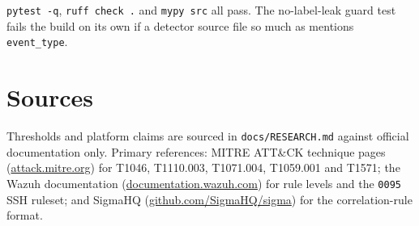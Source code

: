 \documentclass[11pt,a4paper]{article}
\newcommand{\code}[1]{\texttt{#1}}
\begin{document}
\code{pytest -q}, \code{ruff check .} and \code{mypy src} all pass. The
no-label-leak guard test fails the build on its own if a detector source file
so much as mentions \code{event\_type}.

\section*{Sources}

Thresholds and platform claims are sourced in \code{docs/RESEARCH.md} against
official documentation only. Primary references: MITRE ATT\&CK technique pages
(\href{https://attack.mitre.org}{attack.mitre.org}) for T1046, T1110.003,
T1071.004, T1059.001 and T1571; the Wazuh documentation
(\href{https://documentation.wazuh.com}{documentation.wazuh.com}) for rule levels
and the \code{0095} SSH ruleset; and SigmaHQ
(\href{https://github.com/SigmaHQ/sigma}{github.com/SigmaHQ/sigma}) for the
correlation-rule format.
\end{document}
